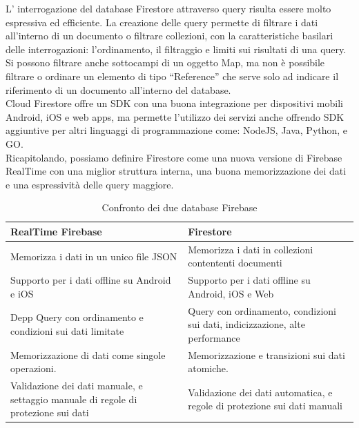 L' interrogazione del database Firestore attraverso query risulta essere molto espressiva ed efficiente. La creazione delle query permette di filtrare i dati all'interno di un documento o filtrare collezioni, con la caratteristiche basilari delle interrogazioni: l'ordinamento, il filtraggio e limiti sui risultati di una query. Si possono filtrare anche sottocampi di un oggetto Map, ma non è possibile filtrare o ordinare un elemento di tipo ``Reference'' che serve solo ad indicare il riferimento di un documento all'interno del database.\\
Cloud Firestore offre un SDK con una buona integrazione per dispositivi mobili Android, iOS e web apps, ma permette l'utilizzo dei servizi anche offrendo SDK aggiuntive per altri linguaggi di programmazione come: NodeJS, Java, Python, e GO.\\
Ricapitolando, possiamo definire Firestore come una nuova versione di Firebase RealTime con una miglior struttura interna, una buona memorizzazione dei dati e una espressività delle query maggiore.

\begin{table}[h]
\begin{center}
\begin{tabular}{|p{7.5cm}|p{7cm}|}
    \hline
    \textbf{RealTime Firebase} & \textbf{Firestore} \\ \hline
    Memorizza i dati in un unico file JSON & Memorizza i dati in collezioni contententi documenti \\ \hline
    Supporto per i dati offline su Android e iOS & Supporto per i dati offline su Android, iOS e Web \\ \hline
    Depp Query con ordinamento e condizioni sui dati limitate & Query con ordinamento, condizioni sui dati, indicizzazione, alte performance \\ \hline
    Memorizzazione di dati come singole operazioni. & Memorizzazione e transizioni sui dati atomiche.\\ \hline
    Validazione dei dati manuale, e settaggio manuale di regole di protezione sui dati &  Validazione dei dati automatica, e regole di protezione sui dati manuali\\
\hline
\end{tabular}
\caption[Confronto tra Firebase e Firestore ]{Confronto dei due database Firebase}\label{tab:Confronto tra  Firestore e Firebase}
\end{center}
\end{table}



